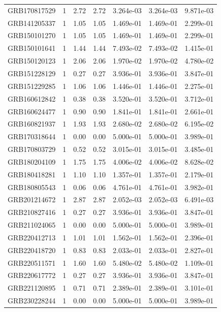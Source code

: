 \documentclass[12pt]{article}
\begin{document}
\begin{table}[h!]
{\begin{tabular}{l c c c c c c}
GRB170817529 & 1 & 2.72 & 2.72 & 3.264e-03 & 3.264e-03 & 9.871e-03 \\
GRB141205337 & 1 & 1.05 & 1.05 & 1.469e-01 & 1.469e-01 & 2.299e-01 \\
GRB150101270 & 1 & 1.05 & 1.05 & 1.469e-01 & 1.469e-01 & 2.299e-01 \\
GRB150101641 & 1 & 1.44 & 1.44 & 7.493e-02 & 7.493e-02 & 1.415e-01 \\
GRB150120123 & 1 & 2.06 & 2.06 & 1.970e-02 & 1.970e-02 & 4.780e-02 \\
GRB151228129 & 1 & 0.27 & 0.27 & 3.936e-01 & 3.936e-01 & 3.847e-01 \\
GRB151229285 & 1 & 1.06 & 1.06 & 1.446e-01 & 1.446e-01 & 2.275e-01 \\
GRB160612842 & 1 & 0.38 & 0.38 & 3.520e-01 & 3.520e-01 & 3.712e-01 \\
GRB160624477 & 1 & 0.90 & 0.90 & 1.841e-01 & 1.841e-01 & 2.661e-01 \\
GRB160821937 & 1 & 1.93 & 1.93 & 2.680e-02 & 2.680e-02 & 6.195e-02 \\
GRB170318644 & 1 & 0.00 & 0.00 & 5.000e-01 & 5.000e-01 & 3.989e-01 \\
GRB170803729 & 1 & 0.52 & 0.52 & 3.015e-01 & 3.015e-01 & 3.485e-01 \\
GRB180204109 & 1 & 1.75 & 1.75 & 4.006e-02 & 4.006e-02 & 8.628e-02 \\
GRB180418281 & 1 & 1.10 & 1.10 & 1.357e-01 & 1.357e-01 & 2.179e-01 \\
GRB180805543 & 1 & 0.06 & 0.06 & 4.761e-01 & 4.761e-01 & 3.982e-01 \\
GRB201214672 & 1 & 2.87 & 2.87 & 2.052e-03 & 2.052e-03 & 6.491e-03 \\
GRB210827416 & 1 & 0.27 & 0.27 & 3.936e-01 & 3.936e-01 & 3.847e-01 \\
GRB211024065 & 1 & 0.00 & 0.00 & 5.000e-01 & 5.000e-01 & 3.989e-01 \\
GRB220412713 & 1 & 1.01 & 1.01 & 1.562e-01 & 1.562e-01 & 2.396e-01 \\
GRB220418720 & 1 & 0.83 & 0.83 & 2.033e-01 & 2.033e-01 & 2.827e-01 \\
GRB220511571 & 1 & 1.60 & 1.60 & 5.480e-02 & 5.480e-02 & 1.109e-01 \\
GRB220617772 & 1 & 0.27 & 0.27 & 3.936e-01 & 3.936e-01 & 3.847e-01 \\
GRB221120895 & 1 & 0.71 & 0.71 & 2.389e-01 & 2.389e-01 & 3.101e-01 \\
GRB230228244 & 1 & 0.00 & 0.00 & 5.000e-01 & 5.000e-01 & 3.989e-01 \\

\end{tabular}}
\end{table}
\end{document}
